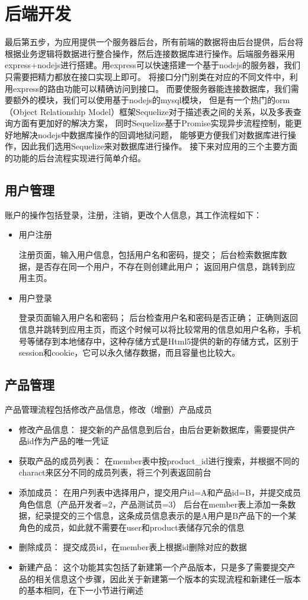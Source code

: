 \section{后端开发}
\label{sec:Backend_development }
最后第五步，为应用提供一个服务器后台，所有前端的数据将由后台提供，后台将根据业务逻辑将数据进行整合操作，然后连接数据库进行操作。后端服务器采用express+nodejs进行搭建。用express可以快速搭建一个基于nodejs的服务器，我们只需要把精力都放在接口实现上即可。
将接口分门别类在对应的不同文件中，利用express的路由功能可以精确访问到接口。
而要使服务器能连接数据库，我们需要额外的模块，我们可以使用基于nodejs的mysql模块，
但是有一个热门的orm（Object Relationship Model）框架Sequelize\cite{Sequelize}对于描述表之间的关系，以及多表查询方面有更加好的解决方案，
同时Sequelize基于Promise实现异步流程控制，能更好地解决nodejs中数据库操作的回调地狱问题，
能够更方便我们对数据库进行操作，因此我们选用Sequelize来对数据库进行操作。
接下来对应用的三个主要方面的功能的后台流程实现进行简单介绍。
\subsection{用户管理}
\label{user_manage}
		账户的操作包括登录，注册，注销，更改个人信息，其工作流程如下：
		\begin{itemize}
			\item 用户注册
			
			注册页面，输入用户信息，包括用户名和密码，提交；
			后台检索数据库数据，是否存在同一个用户，不存在则创建此用户；
			返回用户信息，跳转到应用主页。
			\item 用户登录
			
			登录页面输入用户名和密码；
			后台检查用户名和密码是否正确；
			正确则返回信息并跳转到应用主页，而这个时候可以将比较常用的信息如用户名称，手机号等储存到本地储存中，这种存储方式是Html5提供的新的存储方式，区别于session和cookie，它可以永久储存数据，而且容量也比较大\cite{local}。
		\end{itemize}
			
\subsection{产品管理}
\label{product_manage}
		产品管理流程包括修改产品信息，修改（增删）产品成员
		\begin{itemize}
			\item 修改产品信息：
			提交新的产品信息到后台，由后台更新数据库，需要提供产品id作为产品的唯一凭证
			\item 获取产品的成员列表：
			在member表中按product\_id进行搜索，并根据不同的charact来区分不同的成员列表，将三个列表返回前台
			\item 添加成员：
			在用户列表中选择用户，提交用户id=A和产品id=B，并提交成员角色信息（产品开发者=2，产品测试员=3）
			后台在member表上添加一条数据，纪录提交的三个信息，这条成员信息表示的是A用户是B产品下的一个某角色的成员，如此就不需要在user和product表储存冗余的信息
			\item 删除成员：
			提交成员id，在member表上根据id删除对应的数据
			\item 新建产品：
			这个功能其实包括了新建第一个产品版本，只是多了需要提交产品的相关信息这个步骤，因此关于新建第一个版本的实现流程和新建任一版本的基本相同，在下一小节进行阐述
		\end{itemize}					

